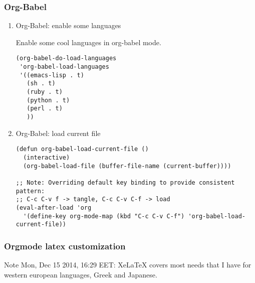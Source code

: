 \documentclass{article}
\begin{document}
\subsubsection{Org-Babel}
\label{sec-2-5-10}
\begin{enumerate}
\item Org-Babel: enable some languages
\label{sec-2-5-10-1}

Enable some cool languages in org-babel mode.

\begin{verbatim}
(org-babel-do-load-languages
 'org-babel-load-languages
 '((emacs-lisp . t)
   (sh . t)
   (ruby . t)
   (python . t)
   (perl . t)
   ))
\end{verbatim}
\item Org-Babel: load current file
\label{sec-2-5-10-2}

\begin{verbatim}
(defun org-babel-load-current-file ()
  (interactive)
  (org-babel-load-file (buffer-file-name (current-buffer))))

;; Note: Overriding default key binding to provide consistent pattern:
;; C-c C-v f -> tangle, C-c C-v C-f -> load
(eval-after-load 'org
  '(define-key org-mode-map (kbd "C-c C-v C-f") 'org-babel-load-current-file))
\end{verbatim}
\end{enumerate}


\subsubsection{Orgmode latex customization}
\label{sec-2-5-11}

Note Mon, Dec 15 2014, 16:29 EET: XeLaTeX covers most needs that I have for western european languages, Greek and Japanese.
\end{document}
